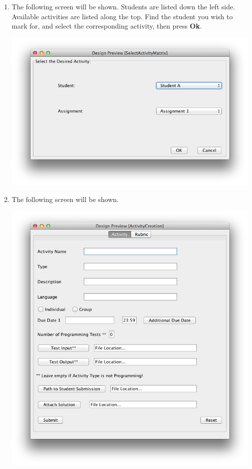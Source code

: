 \documentclass{article}
\begin{document}
\begin{enumerate}
\begin{center}
    \end{center}
  \item The following screen will be shown.  Students are listed down the left
    side. Available activities are listed along the top.  Find the student you
    wish to mark for, and select the corresponding activity, then press \textbf{Ok}.
  \begin{center} 
     \includegraphics[scale=0.55]{../images/UpdatedUIScreens/MarkingActivitySelection.png}
  \end{center} 
  \item The following screen will be shown.
   \begin{center} 
   \includegraphics[scale=0.55]{../images/UpdatedUIScreens/ActivityCreation.png}

\end{center}
\end{enumerate}
\end{document}
